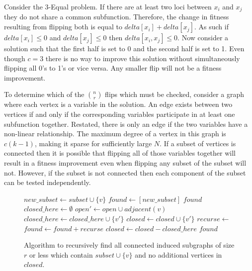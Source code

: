 Consider the 3-Equal problem.  If there are at least two loci between $x_i$ and $x_j$ they do
not share a common subfunction. Therefore, the change in fitness resulting from flipping
both is equal to $delta[x_i] + delta[x_j]$. As such if $delta[x_i] \leq 0$ and $delta[x_j] \leq 0$
then $delta[x_i,x_j] \leq 0$. Now consider a solution such that the first half is set to 0
and the second half is set to 1. Even though $c=3$ there is no way to improve this solution without
simultaneously flipping all 0's to 1's or vice versa. Any smaller flip will not
be a fitness improvement.

To determine which of the $n \choose r$ flips which must be checked, consider a graph where
each vertex is a variable in the solution. An edge exists between two vertices if and only
if the corresponding variables participate in at least one subfunction together. Restated,
there is only an edge if the two variables have a non-linear relationship. The maximum
degree of a vertex in this graph is $c(k-1)$, making it sparse for sufficiently large $N$.
If a subset of vertices is connected then it is possible that flipping all of those
variables together will result in a fitness improvement even when flipping any subset
of the subset will not. However, if the subset is not connected then each component
of the subset can be tested independently.

\begin{figure}
  \begin{algorithmic}[1]
    \State $new\_subset \leftarrow subset \cup \{v\}$
    \State $found \leftarrow [new\_subset]$
      \Return $found$
    \EndIf
    \State $closed\_here \leftarrow \emptyset$
    \State $open' \leftarrow open \cup adjacent(v)$
        \State $closed\_here \leftarrow closed\_here \cup \{v'\}$
        \State $closed \leftarrow closed \cup \{v'\}$
        \State $recurse \leftarrow $
        \State $found \leftarrow found + recurse$
      \EndIf
    \EndFor
    \State $closed \leftarrow closed - closed\_here$
    \State \Return $found$
  \EndProcedure
\end{algorithmic}
  \caption{Algorithm to recursively find all connected induced subgraphs of size $r$ or less which
           contain $subset \cup \{v\}$ and no additional vertices in $closed$.}
  \label{fig-connected-subgraphs}
\end{figure}

